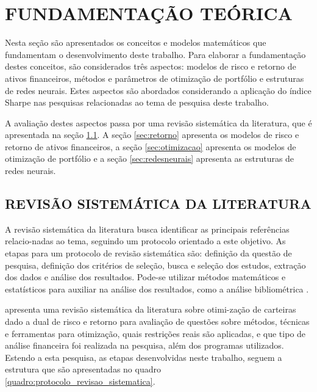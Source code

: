 \section{FUNDAMENTAÇÃO TEÓRICA}

    \ipar Nesta seção são apresentados os conceitos e modelos matemáticos que fundamentam o desenvolvimento deste trabalho. Para elaborar a fundamentação destes conceitos, são considerados três aspectos: modelos de risco e retorno de ativos financeiros, métodos e parâmetros de otimização de portfólio e estruturas de redes neurais. Estes aspectos são abordados considerando a aplicação do índice Sharpe nas pesquisas relacionadas ao tema de pesquisa deste trabalho.
    
    \ipar A avaliação destes aspectos passa por uma revisão sistemática da literatura, que é apresentada na seção \ref{sec:revisao_sistematica}. A seção \ref{sec:retorno} apresenta os modelos de risco e retorno de ativos financeiros, a seção \ref{sec:otimizacao} apresenta os modelos de otimização de portfólio e a seção \ref{sec:redesneurais} apresenta as estruturas de redes neurais.

    \subsection{REVISÃO SISTEMÁTICA DA LITERATURA}
        \label{sec:revisao_sistematica}

        \ipar A revisão sistemática da literatura busca identificar as principais referências relacio-nadas ao tema, seguindo um protocolo orientado a este objetivo. As etapas para um protocolo de revisão sistemática são: definição da questão de pesquisa, definição dos critérios de seleção, busca e seleção dos estudos, extração dos dados e análise dos resultados. Pode-se utilizar métodos matemáticos e estatísticos para auxiliar na análise dos resultados, como a análise bibliométrica \cite{yu2018bibliometric}. 
        
        \ipar {} apresenta uma revisão sistemática da literatura sobre otimi-zação de carteiras dado a dual de risco e retorno para avaliação de questões sobre métodos, técnicas e ferramentas para otimização, quais restrições reais são aplicadas, e que tipo de análise financeira foi realizada na pesquisa, além dos programas utilizados. Estendo a esta pesquisa, as etapas desenvolvidas neste trabalho, seguem a estrutura que são apresentadas no quadro \ref{quadro:protocolo_revisao_sistematica}.


